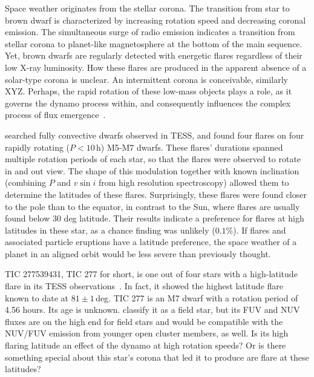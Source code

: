 \documentclass[twocolumn]{aastex631}
\begin{document}
Space weather originates from the stellar corona. The transition from star to brown dwarf is characterized by increasing rotation speed and decreasing coronal emission. The simultaneous surge of radio emission indicates a transition from stellar corona to planet-like magnetosphere at the bottom of the main sequence. Yet, brown dwarfs are regularly detected with energetic flares regardless of their low X-ray luminosity. How these flares are produced in the apparent absence of a solar-type corona is unclear. An intermittent corona is conceivable, similarly XYZ. Perhaps, the rapid rotation of these low-mass objects plays a role, as it governs the dynamo process within, and consequently influences the complex process of flux emergence~\citep{weber2023understanding}.   

\citet{ilin2021giant} searched fully convective dwarfs observed in TESS, and found four flares on four rapidly rotating ($P<10\,$h) M5-M7 dwarfs. These flares' durations spanned multiple rotation periods of each star, so that the flares were observed to rotate in and out view. The shape of this modulation together with known inclination (combining $P$ and $v \sin i$ from high resolution spectroscopy) allowed them to determine the latitudes of these flares. Surprisingly, these flares were found closer to the pole than to the equator, in contrast to the Sun, where flares are usually found below 30 deg latitude. Their results indicate a preference for flares at high latitudes in these star, as a chance finding was unlikely ($0.1\%$). If flares and associated particle eruptions have a latitude preference, the space weather of a planet in an aligned orbit would be less severe than previously thought. %


TIC 277539431, TIC 277 for short, is one out of four stars with a high-latitude flare in its TESS observations~\citep{ilin2021giant}. In fact, it showed the highest latitude flare known to date at $81\pm1\,$deg. TIC 277 is an M7 dwarf with a rotation period of 4.56 hours. Its age is unknown. \citet{schneider2018hazmat} classify it as a field star, but its FUV and NUV fluxes are on the high end for field stars and would be compatible with the NUV/FUV emission from younger open cluster members, as well. 
Is its high flaring latitude an effect of the dynamo at high rotation speeds? Or is there something special about this star's corona that led it to produce are flare at these latitudes? 
\end{document}
